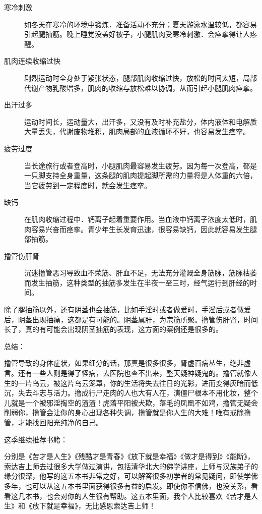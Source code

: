 \begin{description}
    \item[寒冷刺激] 如冬天在寒冷的环境中锻炼．准备活动不充分；夏天游泳水温较低，都容易引起腿抽筋。晚上睡觉没盖好被子，小腿肌肉受寒冷刺激．会痉挛得让人疼醒。
    \item[肌肉连续收缩过快] 剧烈运动时全身处于紧张状态，腿部肌肉收缩过快，放松的时间太短，局部代谢产物乳酸增多，肌肉的收缩与放松难以协调，从而引起小腿肌肉痉挛。
    \item[出汗过多] 运动时间长，运动量大，出汗多，又没有及时补充盐分，体内液体和电解质大量丢失，代谢废物堆积，肌肉局部的血液循环不好，也容易发生痉挛。
    \item[疲劳过度] 当长途旅行或者登高时，小腿肌肉最容易发生疲劳。因为每一次登高，都是一只脚支持全身重量，这条腿的肌肉提起脚所需的力量将是人体重的六倍，当它疲劳到一定程度时，就会发生痉挛。
    \item[缺钙] 在肌肉收缩过程中．钙离子起着重要作用。当血液中钙离子浓度太低时，肌肉容易兴奋而痉挛。青少年生长发育迅速，很容易缺钙，因此就容易发生腿部抽筋。
    \item[撸管伤肝肾] 沉迷撸管恶习导致血不荣筋、肝血不足，无法充分灌溉全身筋脉，筋脉枯萎而发生抽筋，这种类型的抽筋多发生在半夜一至三时，经气运行到肝经的时间。
\end{description}

除了腿抽筋以外，还有阴茎也会抽筋，比如手淫时或者做爱时，手淫后或者做爱后，阴茎出现抽痛，这都是有可能的。阴茎属肝，为宗筋所聚。撸管伤肝肾，时间长了，真的有可能会出现阴茎抽筋的表现，这方面的案例还是很多的。

总结：

撸管导致的身体症状，如果细分的话，那真是很多很多，肾虚百病丛生，绝非虚言。还有一些人则是得了怪病，去医院也查不出来，整天疑神疑鬼的。撸管就像人生的一片乌云，被这片乌云笼罩，你的生活将失去往日的光彩，进而变得灰暗而低沉，失去斗志与活力。撸成行尸走肉的人也大有人在，演僵尸根本不用化妆，整个儿就是一个被邪淫掏空的渣渣！虎落平阳被犬欺，落毛的凤凰不如鸡，撸管无疑会削弱你，撸管会让你的身心出现各种失调，撸管就是你人生的大难！唯有戒除撸管，才能找回阳光纯净的自己。

这季继续推荐书籍：

\begin{book}[索达吉堪布五本]
    分别是《苦才是人生》《残酷才是青春》《放下就是幸福》《做才是得到》《能断》，索达吉上师去过很多大学做过演讲，包括清华北大的佛学讲座，上师与汉族弟子的缘分很深，他写的这五本书非常之好，可以解答很多初学者的常见疑问，即使学佛多年，也可以从这五本书里面获得很多有益的启发。即使你不信佛，也没关系，看看这几本书，也会对你的人生很有帮助。这五本里面，我个人比较喜欢《苦才是人生》和《放下就是幸福》，无比感恩索达吉上师！
\end{book}

